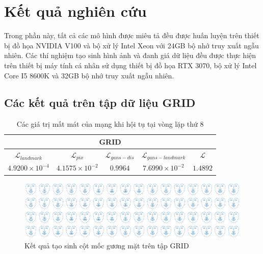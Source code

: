 \section{\texorpdfstring{Kết quả nghiên cứu}{result}}

Trong phần này, tất cả các mô hình được miêu tả đều được huấn luyện trên thiết bị đồ họa NVIDIA V100 và bộ xử lý Intel Xeon với 24GB bộ nhớ truy xuất ngẫu nhiên. Các thí nghiệm tạo sinh hình ảnh và đanh giá dữ liệu đều được thực hiện trên thiết bị máy tính cá nhân sử dụng thiết bị đồ họa RTX 3070, bộ xử lý Intel Core I5 8600K và 32GB bộ nhớ truy xuất ngẫu nhiên.

\subsection{Các kết quả trên tập dữ liệu GRID}

\begin{table}[h]
    \centering
    \begin{tabular}{c | c | c | c | c}
    \hline 
    \multicolumn{5}{c}{GRID}\\
    \hline 
    \textbf{$\mathcal{L}_{landmark}$} & \textbf{$\mathcal{L}_{pix}$} & \textbf{$\mathcal{L}_{gans-dis}$} & \textbf{$\mathcal{L}_{gans-landmark}$} & \textbf{$\mathcal{L}$}\\
    \hline
    $4.9200 \times 10^{-4}$ & $4.1575 \times 10^{-2}$ & $0.9964$ & $7.6990 \times 10^{-2}$ & $1.4892$\\
    \hline
    \end{tabular}
    \caption{Các giá trị mất mát của mạng khi hội tụ tại vòng lặp thứ 8}
    \label{table:grid_loss}
\end{table}

\begin{figure}[H]
    \centering
    \includegraphics[width=15cm]{./content/materials/grid_examples-landmark.png}
    \caption{Kết quả tạo sinh cột mốc gương mặt trên tập GRID}
\end{figure}

